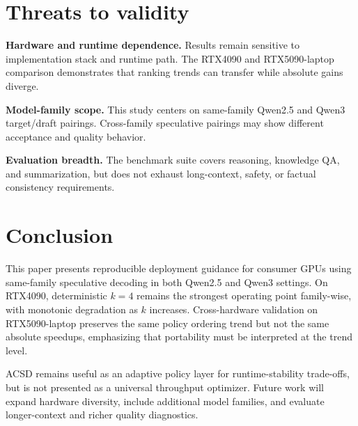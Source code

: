 \section{Threats to validity}
\label{sec:threats}

\textbf{Hardware and runtime dependence.}
Results remain sensitive to implementation stack and runtime path.
The RTX4090 and RTX5090-laptop comparison demonstrates that ranking trends can
transfer while absolute gains diverge.

\textbf{Model-family scope.}
This study centers on same-family Qwen2.5 and Qwen3 target/draft pairings.
Cross-family speculative pairings may show different acceptance and quality
behavior.

\textbf{Evaluation breadth.}
The benchmark suite covers reasoning, knowledge QA, and summarization, but does
not exhaust long-context, safety, or factual consistency requirements.

\section{Conclusion}
\label{sec:conclusion}

This paper presents reproducible deployment guidance for
consumer GPUs using same-family speculative decoding in both Qwen2.5 and
Qwen3 settings. On RTX4090, deterministic $k{=}4$ remains the strongest
operating point family-wise, with monotonic degradation as $k$ increases.
Cross-hardware validation on RTX5090-laptop preserves the same policy ordering
trend but not the same absolute speedups, emphasizing that portability must be
interpreted at the trend level.

ACSD remains useful as an adaptive policy layer for runtime-stability trade-offs,
but is not presented as a universal throughput optimizer.
Future work will expand hardware diversity, include additional model families,
and evaluate longer-context and richer quality diagnostics.
